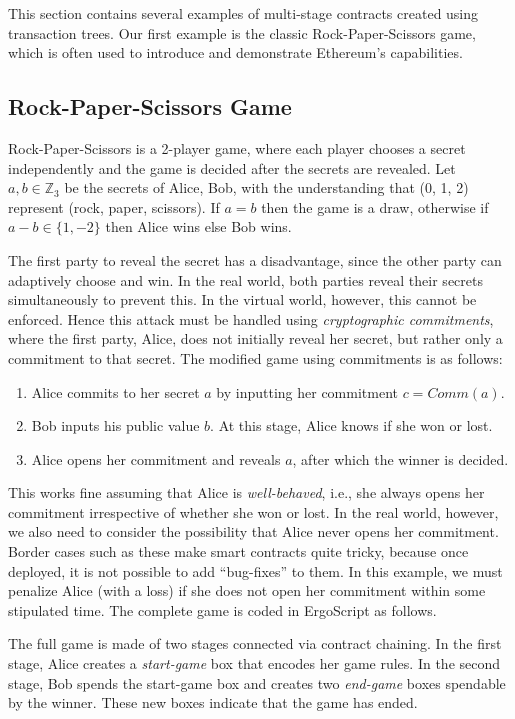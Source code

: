 \documentclass[runningheads]{llncs}
\newcommand{\langname}{ErgoScript\xspace}
\begin{document}
This section contains several examples of multi-stage contracts created using transaction trees.
Our first example is the classic Rock-Paper-Scissors game, which is often used to introduce and demonstrate Ethereum's capabilities.

\subsection{Rock-Paper-Scissors Game}
\label{rps}

Rock-Paper-Scissors is a 2-player game, where each player chooses a secret independently and the game is decided after the secrets are revealed. 
Let $a, b\in \mathbb{Z}_3$ be the secrets of Alice, Bob, with the understanding that (0, 1, 2) represent (rock, paper, scissors). If $a = b$ then the game is a draw, otherwise if $a-b \in \{1, -2\}$ then Alice wins else Bob wins. 

The first party to reveal the secret has a disadvantage, since the other party can adaptively choose and win. In the real world, both parties reveal their secrets simultaneously to prevent this. In the virtual world, however, this cannot be enforced. Hence this attack must be handled using {\em cryptographic commitments}, where the first party, Alice, does not initially reveal her secret, but rather only a commitment to that secret. 
The modified game using commitments is as follows:

\begin{enumerate}
	\item Alice commits to her secret $a$ by inputting her commitment $c = Comm(a)$.
	\item Bob inputs his public value $b$. At this stage, Alice knows if she won or lost.
	\item Alice opens her commitment and reveals $a$, after which the winner is decided.
\end{enumerate}

This works fine assuming that Alice is {\em well-behaved}, i.e., she always opens her commitment irrespective of whether she won or lost. In the real world, however, we also need to consider the possibility that Alice never opens her commitment. 
Border cases such as these make smart contracts quite tricky, because once deployed, it is not possible to add ``bug-fixes'' to them. In this example, we must penalize Alice (with a loss) if she does not open her commitment within some stipulated time.
The complete game is coded in \langname as follows.

The full game is made of two stages connected via contract chaining. In the first stage, Alice creates a {\em start-game} box that encodes her game rules. In the second stage, Bob spends the start-game box and creates two {\em end-game} boxes spendable by the winner. These new boxes indicate that the game has ended.
\end{document}
